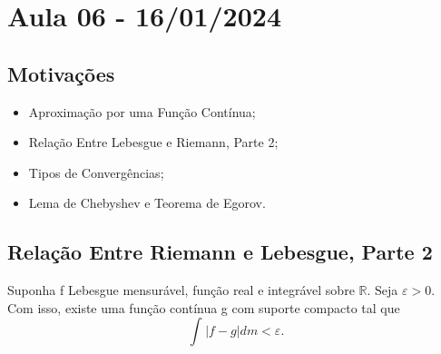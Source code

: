 \documentclass[MeasureTheory/measure_theory.tex]{subfiles}
\begin{document}
\section{Aula 06 - 16/01/2024}
\subsection{Motivações}
\begin{itemize}
	\item Aproximação por uma Função Contínua;
	\item Relação Entre Lebesgue e Riemann, Parte 2;
	\item Tipos de Convergências;
	\item Lema de Chebyshev e Teorema de Egorov.
\end{itemize}
\subsection{Relação Entre Riemann e Lebesgue, Parte 2}
\begin{theorem*}
	Suponha f Lebesgue mensurável, função real e integrável sobre \(\mathbb{R}.\) Seja \(\varepsilon >0\).
	Com isso, existe uma função contínua g com suporte compacto tal que
	\[
		\int_{}|f-g| dm < \varepsilon .
	\]
\end{theorem*}
\end{document}

